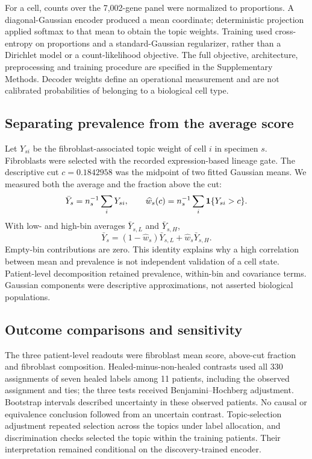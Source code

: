 \documentclass[10pt,a4paper]{article}
\begin{document}
For a cell, counts over the 7,002-gene panel were normalized to proportions. A diagonal-Gaussian encoder produced a mean coordinate; deterministic projection applied softmax to that mean to obtain the topic weights. Training used cross-entropy on proportions and a standard-Gaussian regularizer, rather than a Dirichlet model or a count-likelihood objective. The full objective, architecture, preprocessing and training procedure are specified in the Supplementary Methods. Decoder weights define an operational measurement and are not calibrated probabilities of belonging to a biological cell type.

\subsection{Separating prevalence from the average score}
Let $Y_{si}$ be the fibroblast-associated topic weight of cell $i$ in specimen $s$. Fibroblasts were selected with the recorded expression-based lineage gate. The descriptive cut $c=0.1842958$ was the midpoint of two fitted Gaussian means. We measured both the average and the fraction above the cut:
\begin{equation}
\bar Y_s=n_s^{-1}\sum_iY_{si},\qquad
\widehat w_s(c)=n_s^{-1}\sum_i\mathbf{1}\{Y_{si}>c\}.\label{eq:p1fraction}
\end{equation}
With low- and high-bin averages $\bar Y_{s,L}$ and $\bar Y_{s,H}$,
\begin{equation}
\bar Y_s=(1-\widehat w_s)\bar Y_{s,L}+\widehat w_s\bar Y_{s,H}.\label{eq:p1identity}
\end{equation}
Empty-bin contributions are zero. This identity explains why a high correlation between mean and prevalence is not independent validation of a cell state. Patient-level decomposition retained prevalence, within-bin and covariance terms. Gaussian components were descriptive approximations, not asserted biological populations.

\subsection{Outcome comparisons and sensitivity}
The three patient-level readouts were fibroblast mean score, above-cut fraction and fibroblast composition. Healed-minus-non-healed contrasts used all 330 assignments of seven healed labels among 11 patients, including the observed assignment and ties; the three tests received Benjamini--Hochberg adjustment. Bootstrap intervals described uncertainty in these observed patients. No causal or equivalence conclusion followed from an uncertain contrast. Topic-selection adjustment repeated selection across the topics under label allocation, and discrimination checks selected the topic within the training patients. Their interpretation remained conditional on the discovery-trained encoder.
\end{document}
